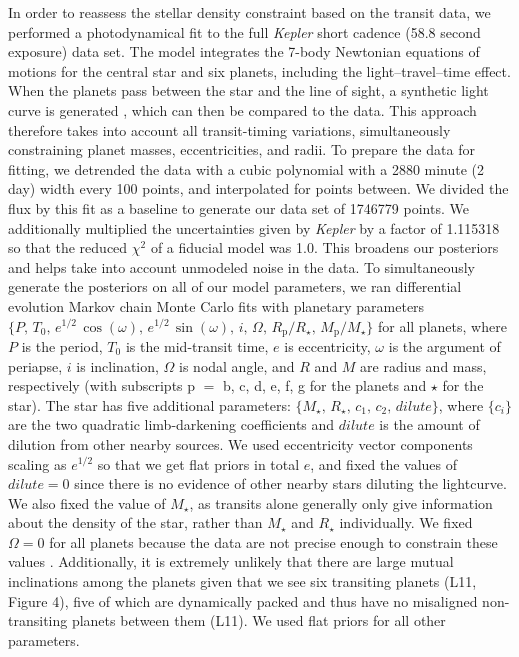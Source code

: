 \documentclass[twocolumn,trackchanges]{aastex61}
\newcommand{\Kepler}{\textit{Kepler} }
\begin{document}
In order to reassess the stellar density constraint based on the transit data, we performed a photodynamical fit to the full \Kepler short cadence (58.8 second exposure) data set. The model integrates the 7-body Newtonian equations of motions for the central star and six planets, including the light--travel--time effect. When the planets pass between the star and the line of sight, a synthetic light curve is generated \citep{2012MNRAS.420.1630P}, which can then be compared to the data. This approach therefore takes into account all transit-timing variations, simultaneously constraining planet masses, eccentricities, and radii. To prepare the data for fitting, we detrended the data with a cubic polynomial with a 2880 minute (2 day) width every 100 points, and interpolated for points between. We divided the flux by this fit as a baseline to generate our data set of 1746779 points. We additionally multiplied the uncertainties given by \Kepler by a factor of 1.115318 so that the reduced $\chi^2$ of a fiducial model was 1.0. This broadens our posteriors and helps take into account unmodeled noise in the data. To simultaneously generate the posteriors on all of our model parameters, we ran differential evolution Markov chain Monte Carlo \cite[DEMCMC, ][]{TerBraak2005} fits with planetary parameters $\{P,\, T_0,\, e^{1/2} \, \cos(\omega),\, e^{1/2} \, \sin(\omega),\, i,\, \Omega,\, R_\mathrm{p}/R_\star,\, M_\mathrm{p}/M_\star\}$ for all planets, where $P$ is the period, $T_0$ is the mid-transit time, $e$ is eccentricity, $\omega$ is the argument of periapse, $i$ is inclination, $\Omega$ is nodal angle, and $R$ and $M$ are radius and mass, respectively (with subscripts p $=$ b, c, d, e, f, g for the planets and $\star$ for the star). The star has five additional parameters: $\{M_\star,\, R_\star,\, c_1,\, c_2,\, dilute\}$, where $\{c_i\}$ are the two quadratic limb-darkening coefficients and $dilute$ is the amount of dilution from other nearby sources. We used eccentricity vector components scaling as $e^{1/2}$ so that we get flat priors in total $e$, and fixed the values of $dilute=0$ since there is no evidence of other nearby stars diluting the lightcurve. We also fixed the value of $M_\star$, as transits alone generally only give information about the density of the star, rather than $M_\star$ and $R_\star$ individually. We fixed $\Omega = 0$ for all planets because the data are not precise enough to constrain these values \citep{Migaszewski2012}. Additionally, it is extremely unlikely that there are large mutual inclinations among the planets given that we see six transiting planets (L11, Figure 4), five of which are dynamically packed and thus have no misaligned non-transiting planets between them (L11). We used flat priors for all other parameters.
\end{document}
